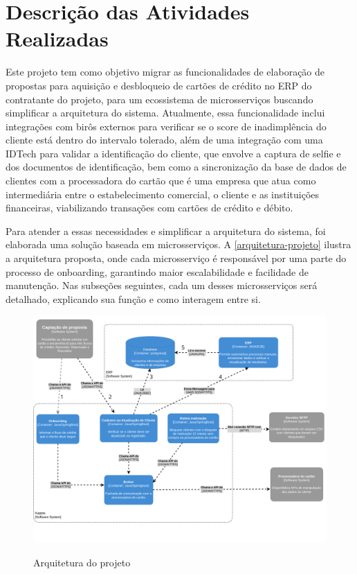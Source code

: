 \chapter{Descrição das Atividades Realizadas}
\label{cap:atividades}

Este projeto tem como objetivo migrar as funcionalidades de elaboração de propostas para 
aquisição e desbloqueio de cartões de crédito no ERP
do contratante do projeto, para um ecossistema de microsserviços buscando simplificar 
a arquitetura do sistema. Atualmente, essa funcionalidade inclui integrações com 
birôs externos para verificar se o score de inadimplência do cliente está dentro do 
intervalo tolerado, além de uma integração com uma IDTech para validar a identificação 
do cliente, que envolve a captura de selfie e dos documentos de identificação, bem 
como a sincronização da base de dados  de clientes com a processadora do cartão que é 
uma empresa que atua como intermediária entre o estabelecimento comercial, 
o cliente e as instituições financeiras, viabilizando transações com cartões de 
crédito e débito.

Para atender a essas necessidades e simplificar a arquitetura do sistema, 
foi elaborada uma solução baseada em microsserviços. 
A \autoref{arquitetura-projeto} ilustra a arquitetura proposta, 
onde cada microsserviço é responsável por uma parte do processo de onboarding, 
garantindo maior escalabilidade e facilidade de manutenção. Nas subseções seguintes, 
cada um desses microsserviços será detalhado, explicando sua 
função e como interagem entre si.


\begin{figure} [!h]
    \centering
    \caption{Arquitetura do projeto}
    \includegraphics[width=1\textwidth]{arquivos/imagens/arquitetura-relatorio-estagio.pdf}
    \label{arquitetura-projeto}
\end{figure}

